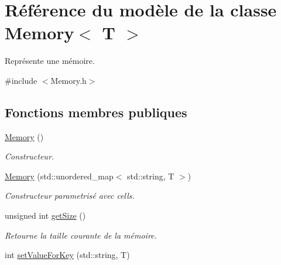 \hypertarget{classMemory}{\section{Référence du modèle de la classe Memory$<$ T $>$}
\label{classMemory}
}


Représente une mémoire.  




{\ttfamily \#include $<$Memory.\-h$>$}

\subsection*{Fonctions membres publiques}
\begin{DoxyCompactItemize}
\item 
\hypertarget{classMemory_aa546b7c6e170e45a4e4f74492d8fe8bf}{\hyperlink{classMemory_aa546b7c6e170e45a4e4f74492d8fe8bf}{Memory} ()}\label{classMemory_aa546b7c6e170e45a4e4f74492d8fe8bf}

\begin{DoxyCompactList}\small\item\em Constructeur. \end{DoxyCompactList}\item 
\hypertarget{classMemory_af1e6452dbe3bb1650604140814710b95}{\hyperlink{classMemory_af1e6452dbe3bb1650604140814710b95}{Memory} (std\-::unordered\-\_\-map$<$ std\-::string, T $>$)}\label{classMemory_af1e6452dbe3bb1650604140814710b95}

\begin{DoxyCompactList}\small\item\em Constructeur parametrisé avec cells. \end{DoxyCompactList}\item 
\hypertarget{classMemory_add46d3ed56cf1e88efee2ed59b38c995}{unsigned int \hyperlink{classMemory_add46d3ed56cf1e88efee2ed59b38c995}{get\-Size} ()}\label{classMemory_add46d3ed56cf1e88efee2ed59b38c995}

\begin{DoxyCompactList}\small\item\em Retourne la taille courante de la mémoire. \end{DoxyCompactList}\item 
\hypertarget{classMemory_a3514e7594615bb1748ba5b57259c9eca}{int \hyperlink{classMemory_a3514e7594615bb1748ba5b57259c9eca}{set\-Value\-For\-Key} (std\-::string, T)}\label{classMemory_a3514e7594615bb1748ba5b57259c9eca}


\end{DoxyCompactItemize}
